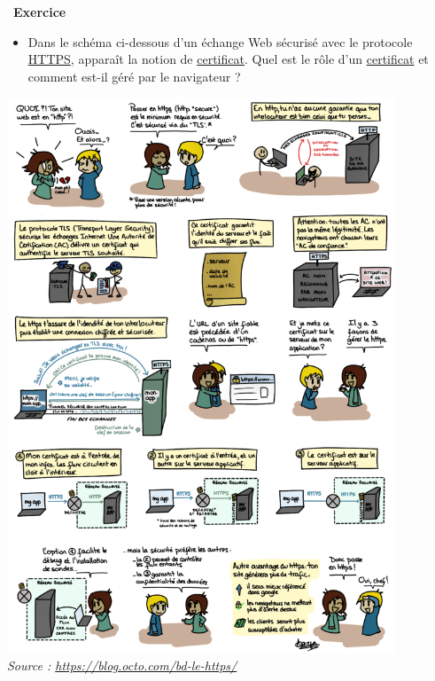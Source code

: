 \documentclass[
  11pt,
]{article}
\providecommand{\tightlist}{%
  \setlength{\itemsep}{0pt}\setlength{\parskip}{0pt}}
\newcounter{exo}
\newenvironment{exercice}[1]
{\par \medskip   \addtocounter{exo}{1} \noindent  
\begin{bclogo}[arrondi =0.1,   noborder = true, logo=\bccrayon, marge=4]{~\textbf{Exercice} \textbf{\theexo} {\itshape #1} }  \par}
{
\end{bclogo}
 \par \bigskip }
\begin{document}
\begin{exercice}{}
\begin{enumerate}
  \begin{itemize}
  \tightlist
  \item
    Dans le schéma ci-dessous d'un échange Web sécurisé avec le
    protocole
    \href{https://developer.mozilla.org/fr/docs/Glossaire/https}{HTTPS},
    apparaît la notion de
    \href{https://developer.mozilla.org/fr/docs/Glossaire/Certificat_num\%C3\%A9rique}{certificat}.
    Quel est le rôle d'un
    \href{https://developer.mozilla.org/fr/docs/Glossaire/Certificat_num\%C3\%A9rique}{certificat}
    et comment est-il géré par le navigateur ?
  \end{itemize}

  \includegraphics[width=0.87\textwidth,height=\textheight]{images/tls-3-717x1024.png}\\

  \emph{Source : \url{https://blog.octo.com/bd-le-https/}}
\end{enumerate}

\end{exercice}
\end{document}

